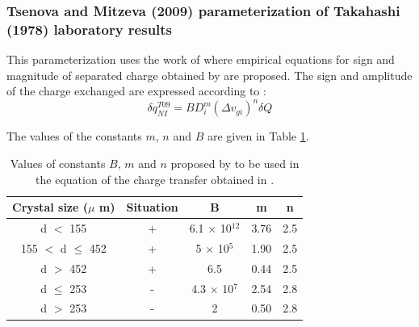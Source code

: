\subsubsection{Tsenova and Mitzeva (2009) parameterization of Takahashi (1978) laboratory results}

This parameterization uses the work of \citet{Tsenova-2009} where empirical equations for sign and magnitude of separated charge obtained by \citet{Takahashi-1978} are proposed. 
The sign and amplitude of the charge exchanged are expressed according to \citet{Saunders-1991}:
\begin{equation}
  \delta q_{NI} ^{T09} = B D_i ^m (\Delta v_{gi})^n \delta Q
\end{equation}

\noindent
The values of the constants $m$, $n$ and $B$ are given in Table \ref{tab:param_taka1}.
\begin{table}[h]
  \begin{center}
  \begin{tabular}{|c|c|c|c|c|}
    \hline
    Crystal size ($\mu$ m) & Situation & B & m & n \\
    \hline
    d $<$ 155            & + & 6.1  $\times$ 10$^{12}$ & 3.76 & 2.5 \\
    \hline
    155 $<$ d $\leq$ 452 & + & 5    $\times$ 10$^{5}$  & 1.90 & 2.5 \\
    \hline
    d $>$ 452            & + & 6.5                     & 0.44 & 2.5 \\
    \hline
    d $\leq$ 253         & - & 4.3  $\times$ 10$^{7}$  & 2.54 & 2.8 \\
    \hline
    d $>$ 253            & - & 2                       & 0.50 & 2.8 \\
    \hline
  \end{tabular}
  \end{center}
  \caption{\small Values of constants $B$, $m$ and $n$ proposed by \citet{Tsenova-2009} to be used in the equation of the charge transfer obtained in \citet{Takahashi-1978}.}
  \label{tab:param_taka1}
\end{table}

